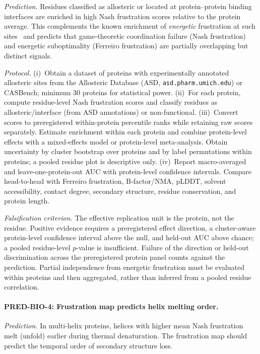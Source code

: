 \documentclass[12pt,a4paper]{article}
\theoremstyle{remark}
\begin{document}
\textit{Prediction.}
Residues classified as allosteric or located at protein--protein binding interfaces are enriched in high Nash frustration scores relative to the protein average. This complements the known enrichment of \emph{energetic} frustration at such sites~\citep{Ferreiro2014} and predicts that game-theoretic coordination failure (Nash frustration) and energetic suboptimality (Ferreiro frustration) are partially overlapping but distinct signals.

\textit{Protocol.}
(i)~Obtain a dataset of proteins with experimentally annotated allosteric sites from the Allosteric Database (ASD, \texttt{asd.pharm.umich.edu}) or CASBench; minimum 30 proteins for statistical power.
(ii)~For each protein, compute residue-level Nash frustration scores and classify residues as allosteric/interface (from ASD annotations) or non-functional.
(iii)~Convert scores to preregistered within-protein percentile ranks while retaining raw scores separately. Estimate enrichment within each protein and combine protein-level effects with a mixed-effects model or protein-level meta-analysis. Obtain uncertainty by cluster bootstrap over proteins and by label permutations within proteins; a pooled residue plot is descriptive only.
(iv)~Report macro-averaged and leave-one-protein-out AUC with protein-level confidence intervals. Compare head-to-head with Ferreiro frustration, B-factor/NMA, pLDDT, solvent accessibility, contact degree, secondary structure, residue conservation, and protein length.

\textit{Falsification criterion.}
The effective replication unit is the protein, not the residue. Positive evidence requires a preregistered effect direction, a cluster-aware protein-level confidence interval above the null, and held-out AUC above chance; a pooled residue-level $p$-value is insufficient. Failure of the direction or held-out discrimination across the preregistered protein panel counts against the prediction. Partial independence from energetic frustration must be evaluated within proteins and then aggregated, rather than inferred from a pooled residue correlation.

\paragraph{PRED-BIO-4: Frustration map predicts helix melting order.}

\textit{Prediction.}
In multi-helix proteins, helices with higher mean Nash frustration melt (unfold) earlier during thermal denaturation. The frustration map should predict the temporal order of secondary structure loss.
\end{document}
